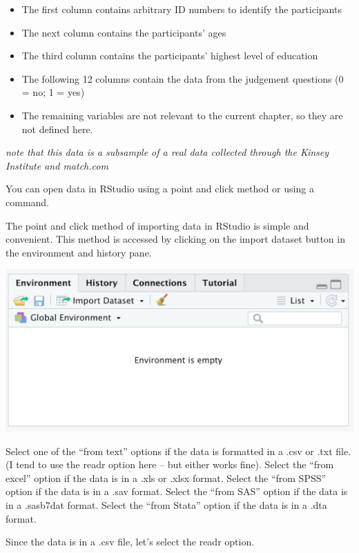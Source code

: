 \documentclass[
]{book}
\providecommand{\tightlist}{%
  \setlength{\itemsep}{0pt}\setlength{\parskip}{0pt}}
\begin{document}
\begin{itemize}
\tightlist
\item
  The first column contains arbitrary ID numbers to identify the participants\\
\item
  The next column contains the participants' ages
\item
  The third column contains the participants' highest level of education
\item
  The following 12 columns contain the data from the judgement questions (0 = no; 1 = yes)
\item
  The remaining variables are not relevant to the current chapter, so they are not defined here.
\end{itemize}

\emph{note that this data is a subsample of a real data collected through the Kinsey Institute and match.com}

You can open data in RStudio using a point and click method or using a command.

The point and click method of importing data in RStudio is simple and convenient. This method is accessed by clicking on the import dataset button in the environment and history pane.

\includegraphics{img/DATA THINGS 1R5.png}

Select one of the ``from text'' options if the data is formatted in a .csv or .txt file. (I tend to use the readr option here -- but either works fine). Select the ``from excel'' option if the data is in a .xls or .xlsx format. Select the ``from SPSS'' option if the data is in a .sav format. Select the ``from SAS'' option if the data is in a .sasb7dat format. Select the ``from Stata'' option if the data is in a .dta format.

Since the data is in a .csv file, let's select the readr option.
\end{document}
